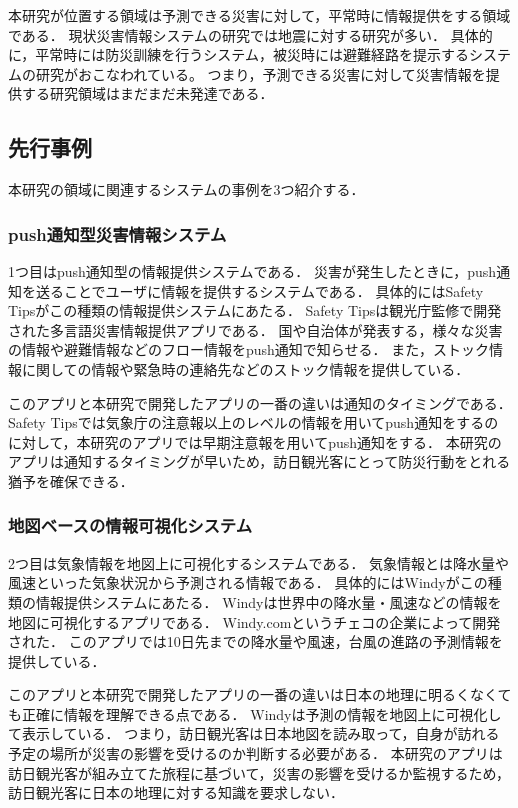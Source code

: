 \documentclass[a4paper,11pt,oneside,openany]{jsbook}
\begin{document}
本研究が位置する領域は予測できる災害に対して，平常時に情報提供をする領域である．
現状災害情報システムの研究では地震に対する研究が多い．
具体的に，平常時には防災訓練を行うシステム\cite{1050574047089440256,1520577741138112640}，被災時には避難経路を提示するシステムの研究がおこなわれている\cite{1050292572101475584,1050855522101622784,1050011097136129280,1390569634314138496,1390574181079225984,1050292572101463552,1520856738287330432}。
つまり，予測できる災害に対して災害情報を提供する研究領域はまだまだ未発達である．

\subsection{先行事例}
本研究の領域に関連するシステムの事例を3つ紹介する．

\subsubsection{push通知型災害情報システム}
1つ目はpush通知型の情報提供システムである．
災害が発生したときに，push通知を送ることでユーザに情報を提供するシステムである．
具体的にはSafety Tips\cite{SafetyTips}がこの種類の情報提供システムにあたる．
Safety Tipsは観光庁監修で開発された多言語災害情報提供アプリである．
国や自治体が発表する，様々な災害の情報や避難情報などのフロー情報をpush通知で知らせる．
また，ストック情報に関しての情報や緊急時の連絡先などのストック情報を提供している．

このアプリと本研究で開発したアプリの一番の違いは通知のタイミングである．
Safety Tipsでは気象庁の注意報以上のレベルの情報を用いてpush通知をするのに対して，本研究のアプリでは早期注意報を用いてpush通知をする．
本研究のアプリは通知するタイミングが早いため，訪日観光客にとって防災行動をとれる猶予を確保できる．

\subsubsection{地図ベースの情報可視化システム}
2つ目は気象情報を地図上に可視化するシステムである．
気象情報とは降水量や風速といった気象状況から予測される情報である．
具体的にはWindy\cite{Windy}がこの種類の情報提供システムにあたる．
Windyは世界中の降水量・風速などの情報を地図に可視化するアプリである．
Windy.comというチェコの企業によって開発された．
このアプリでは10日先までの降水量や風速，台風の進路の予測情報を提供している．

このアプリと本研究で開発したアプリの一番の違いは日本の地理に明るくなくても正確に情報を理解できる点である．
Windyは予測の情報を地図上に可視化して表示している．
つまり，訪日観光客は日本地図を読み取って，自身が訪れる予定の場所が災害の影響を受けるのか判断する必要がある．
本研究のアプリは訪日観光客が組み立てた旅程に基づいて，災害の影響を受けるか監視するため，訪日観光客に日本の地理に対する知識を要求しない．
\end{document}
